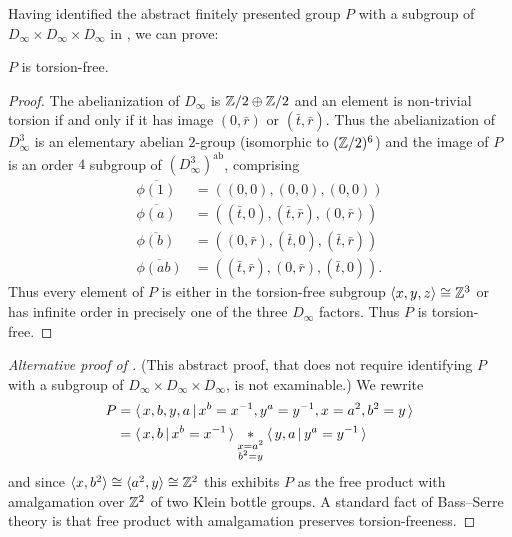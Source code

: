 Having identified the abstract finitely presented group $P$ with a subgroup of $D_\infty \times D_\infty \times D_\infty$ in , we can prove:

\begin{corollary}
    \label{corollary:P_is_tf}
    $P$ is torsion-free.
\end{corollary}

\begin{proof}
    The abelianization of $D_\infty$ is $\mathbb{Z}/2 \oplus \mathbb{Z}/2$ and an element is non-trivial torsion if and only if it has image $(0, \bar{r})$ or $(\bar{t}, \bar{r})$.
    Thus the abelianization of $D_\infty^3$ is an elementary abelian $2$-group (isomorphic to $(\mathbb{Z}/2)^6$) and the image of $P$ is an order $4$ subgroup of $(D_\infty^3)^\text{ab}$, comprising
    \begin{align*}
        \overline{\phi(1)} &= ((0, 0), (0, 0), (0, 0)) \\
        \overline{\phi(a)} &= ((\bar{t}, 0), (\bar{t}, \bar{r}), (0, \bar{r})) \\
        \overline{\phi(b)} &= ((0, \bar{r}), (\bar{t}, 0), (\bar{t}, \bar{r})) \\
        \overline{\phi(ab)} &= ((\bar{t}, \bar{r}), (0, \bar{r}), (\bar{t}, 0)).
    \end{align*}
    Thus every element of $P$ is either in the torsion-free subgroup $\langle x, y, z \rangle \cong \mathbb{Z}^3$ or has infinite order in precisely one of the three $D_\infty$ factors.
    Thus $P$ is torsion-free.
\end{proof}

\begin{proof}[Alternative proof of ]
    (This abstract proof, that does not require identifying $P$ with a subgroup of $D_\infty \times D_\infty \times D_\infty$, is not examinable.)
    We rewrite
    \begin{align*}
        P
        &= \langle \, x, b, y, a \, | \, x^b = x^{-1}, y^a = y^{-1}, x=a^2, b^2 = y \, \rangle \\
        &= \langle \, x, b \, | \, x^b = x^{-1} \, \rangle \underset{\substack{x = a^2 \\ b^2 = y}}{*} \langle \, y, a \, | \, y^a = y^{-1} \, \rangle
    \end{align*}
    and since $\langle x, b^2 \rangle \cong \langle a^2, y \rangle \cong \mathbb{Z}^2$ this exhibits $P$ as the free product with amalgamation over $\mathbb{Z}^2$ of two Klein bottle groups.
    A standard fact of Bass--Serre theory is that free product with amalgamation preserves torsion-freeness.
\end{proof}

